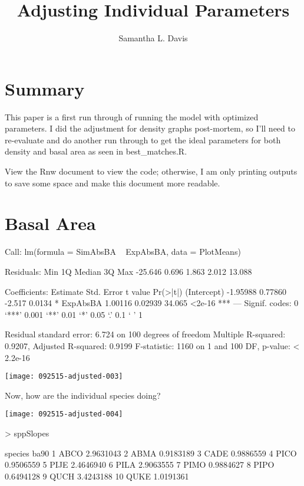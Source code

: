 \documentclass{article}
\begin{document}


\title{Adjusting Individual Parameters}
\author{Samantha L. Davis}

\maketitle

\section{Summary}
This paper is a first run through of running the model with optimized parameters. I did the adjustment for density graphs post-mortem, so I'll need to re-evaluate and do another run through to get the ideal parameters for both density and basal area as seen in best\_matches.R.

View the Rnw document to view the code; otherwise, I am only printing outputs to save some space and make this document more readable.





\newpage

\section{Basal Area}
\begin{Schunk}
\begin{Soutput}
Call:
lm(formula = SimAbsBA ~ ExpAbsBA, data = PlotMeans)

Residuals:
    Min      1Q  Median      3Q     Max 
-25.646   0.696   1.863   2.012  13.088 

Coefficients:
            Estimate Std. Error t value Pr(>|t|)    
(Intercept) -1.95988    0.77860  -2.517   0.0134 *  
ExpAbsBA     1.00116    0.02939  34.065   <2e-16 ***
---
Signif. codes:  0 ‘***’ 0.001 ‘**’ 0.01 ‘*’ 0.05 ‘.’ 0.1 ‘ ’ 1

Residual standard error: 6.724 on 100 degrees of freedom
Multiple R-squared:  0.9207,	Adjusted R-squared:  0.9199 
F-statistic:  1160 on 1 and 100 DF,  p-value: < 2.2e-16
\end{Soutput}
\end{Schunk}
\texttt{[image: 092515-adjusted-003]}

Now, how are the individual species doing?

\texttt{[image: 092515-adjusted-004]}
\begin{Schunk}
\begin{Sinput}
>   sppSlopes
\end{Sinput}
\begin{Soutput}
   species      ba90
1     ABCO 2.9631043
2     ABMA 0.9183189
3     CADE 0.9886559
4     PICO 0.9506559
5     PIJE 2.4646940
6     PILA 2.9063555
7     PIMO 0.9884627
8     PIPO 0.6494128
9     QUCH 3.4243188
10    QUKE 1.0191361
\end{Soutput}
\end{Schunk}
\end{document}
